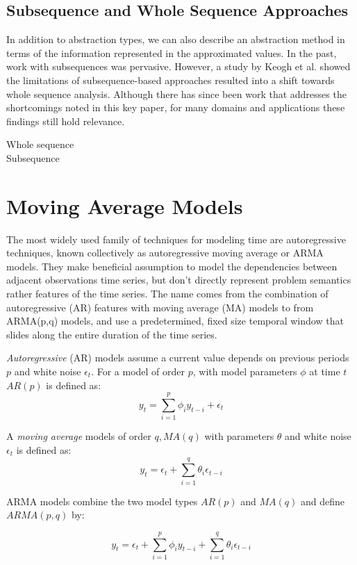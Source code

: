 \subsection{Subsequence and Whole Sequence Approaches}

In addition to abstraction types, we can also describe an abstraction method in terms of the information represented in the approximated values.   In the past, work with subsequences was pervasive.  However, a study by Keogh et al. showed the limitations of subsequence-based approaches resulted into a shift towards whole sequence analysis.  Although there has since been work that addresses the shortcomings noted in this key paper, for many domains and applications these findings still hold relevance.
\begin{description}
  \item [Whole sequence]
  \item [Subsequence]
\end{description}

\section{Moving Average Models}

The most widely used family of techniques for modeling time are autoregressive techniques, known collectively as autoregressive moving average or ARMA models.  They make beneficial assumption to model the dependencies between adjacent observations time series, but don't directly represent problem semantics rather features of the time series.  The name comes from the combination of autoregressive (AR) features with moving average (MA) models to from ARMA(p,q) models, and use a predetermined, fixed size temporal window that slides along the entire duration of the time series.

 \emph{Autoregressive} (AR) models assume a current value depends on previous periods $p$ and white noise $\epsilon_t$.  For a model of order $p$, with model parameters $\phi$ at time $t$ $AR(p)$ is defined as:
 $$y_t= \sum_{i=1}^{p}\phi_{i}y_{t-i}+\epsilon_t$$

 A \emph{moving average} models of order $q, MA(q)$ with parameters $\theta$ and white noise $\epsilon_t$ is defined as:
 $$y_t= \epsilon_t+\sum_{i=1}^{q}\theta_{i}\epsilon_{t-i}$$

 ARMA models combine the two model types $AR(p)$ and $MA(q)$ and define $ARMA(p,q)$ by:

$$y_t= \epsilon_t + \sum_{i=1}^{p}\phi_{i}y_{t-i}+\sum_{i=1}^{q}\theta_{i}\epsilon_{t-i}$$

